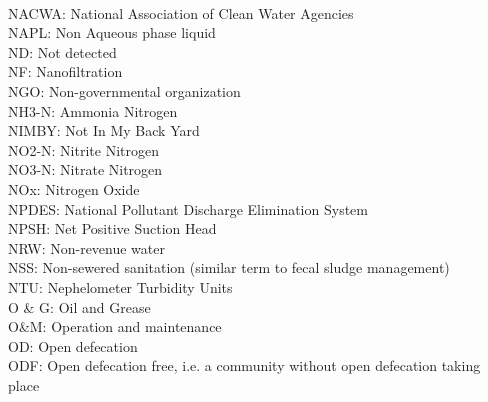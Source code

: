 \documentclass{article}
\begin{document}
\vspace{0.3cm}\\
NACWA:  National Association of Clean Water Agencies
\vspace{0.3cm}\\
NAPL:  Non Aqueous phase liquid
\vspace{0.3cm}\\
ND:  Not detected
\vspace{0.3cm}\\
NF:  Nanofiltration
\vspace{0.3cm}\\
NGO:  Non-governmental organization
\vspace{0.3cm}\\
NH3-N:  Ammonia Nitrogen
\vspace{0.3cm}\\
NIMBY:  Not In My Back Yard
\vspace{0.3cm}\\
NO2-N:  Nitrite Nitrogen 
\vspace{0.3cm}\\
NO3-N:  Nitrate Nitrogen
\vspace{0.3cm}\\
NOx:  Nitrogen Oxide
\vspace{0.3cm}\\
NPDES:  National Pollutant Discharge Elimination System
\vspace{0.3cm}\\
NPSH:  Net Positive Suction Head
\vspace{0.3cm}\\
NRW:  Non-revenue water
\vspace{0.3cm}\\
NSS:  Non-sewered sanitation (similar term to fecal sludge management)
\vspace{0.3cm}\\
NTU:  Nephelometer Turbidity Units
\vspace{0.3cm}\\
O \& G:  Oil and Grease
\vspace{0.3cm}\\
O\&M:  Operation and maintenance
\vspace{0.3cm}\\
OD:  Open defecation
\vspace{0.3cm}\\
ODF:  Open defecation free, i.e. a community without open defecation taking place
\vspace{0.3cm}\\
\end{document}
